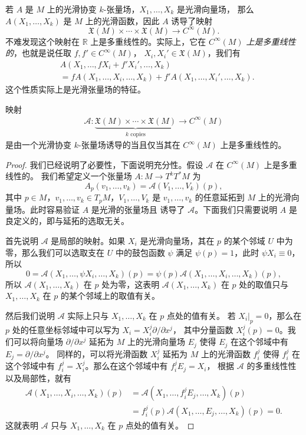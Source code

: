 若 $A$ 是 $M$ 上的光滑协变 $k$-张量场，$X_1,\dots,X_k$ 是光滑向量场，
那么 $A(X_1,\dots,X_k)$ 是 $M$ 上的光滑函数，因此 $A$ 诱导了映射
\[
  \mathfrak{X}(M)\times\cdots\times \mathfrak{X}(M)\to C^\infty(M).  
\]
不难发现这个映射在 $\mathbb{R}$ 上是多重线性的。实际上，它在 
\emph{$C^\infty(M)$ 上是多重线性的}，也就是说任取 $f,f'\in C^\infty(M)$，
$X_i,X_i'\in \mathfrak{X}(M)$，我们有
\begin{align*}
  &A(X_1,\dots,fX_i+f'X_i',\dots,X_k)\\
  &=fA(X_1,\dots,X_i,\dots,X_k)+f'A(X_1,\dots,X_i',\dots,X_k).
\end{align*}
这个性质实际上是光滑张量场的特征。

\begin{lemma}[张量表征引理]\label{lemma:tensor characterization 1}
  映射
  \begin{align*}
    \mathcal{A}:\underbrace{\mathfrak{X}(M)\times\cdots\times \mathfrak{X}(M)}
    _{\text{$k$ copies}}\to C^\infty(M)
  \end{align*}
  是由一个光滑协变 $k$-张量场诱导的当且仅当其在 $C^\infty(M)$ 上是多重线性的。
\end{lemma}
\begin{proof}
  我们已经说明了必要性，下面说明充分性。假设 $\mathcal{A}$ 在 $C^\infty(M)$ 上是多重线性的。
  我们希望定义一个张量场 $A:M\to T^kT^*M$ 为
  \[
    A_p(v_1,\dots,v_k)=\mathcal{A}(V_1,\dots,V_k)(p),  
  \]
  其中 $p\in M$，$v_1,\dots,v_k\in T_pM$，$V_1,\dots,V_k$ 是 $v_1,\dots,v_k$
  的任意延拓到 $M$ 上的光滑向量场。此时容易验证 $A$ 是光滑的张量场且
  诱导了 $\mathcal{A}$。下面我们只需要说明 $A$ 是良定义的，即与延拓的选取无关。

  首先说明 $\mathcal{A}$ 是局部的映射。如果 $X_i$ 是光滑向量场，其在 $p$
  的某个邻域 $U$ 中为零，那么我们可以选取支在 $U$ 中的鼓包函数 $\psi$
  满足 $\psi(p)=1$，此时 $\psi X_i\equiv 0$，所以
  \[
    0=\mathcal{A}(X_1,\dots,\psi X_i,\dots,X_k)(p)= 
  \psi(p)\mathcal{A}(X_1,\dots,X_i,\dots,X_k)(p),
  \]
  所以 $\mathcal{A}(X_1,\dots,X_k)$ 在 $p$ 处为零，这表明 $\mathcal{A}(X_1,\dots,X_k)$
  在 $p$ 处的取值只与 $X_1,\dots,X_k$ 在 $p$ 的某个邻域上的取值有关。

  然后我们说明 $\mathcal{A}$ 实际上只与 $X_1,\dots,X_k$ 在 $p$ 点处的值有关。
  若 $X_i|_p=0$，那么在 $p$ 处的任意坐标邻域中可以写为 $X_i=X_i^j\partial/\partial x^j$，
  其中分量函数 $X_i^j(p)=0$。我们可以将向量场 $\partial/\partial x^j$
  延拓为 $M$ 上的光滑向量场 $E_j$ 使得 $E_j$ 在这个邻域中有 $E_j=\partial/\partial x^j$。
  同样的，可以将光滑函数 $X_i^j$ 延拓为 $M$ 上的光滑函数 $f_i^j$ 使得
  $f_i^j$ 在这个邻域中有 $f_i^j=X_i^j$。那么在这个邻域中有 $f_i^jE_j=X_i$，
  根据 $\mathcal{A}$ 的多重线性性以及局部性，就有
  \begin{align*}
    \mathcal{A}(X_1,\dots,X_i,\dots,X_k)(p)&=
    \mathcal{A}(X_1,\dots,f_i^jE_j,\dots,X_k)(p)\\
    &=f_i^j(p)\mathcal{A}(X_1,\dots,E_j,\dots,X_k)(p)=0.
  \end{align*} 
  这就表明 $\mathcal{A}$ 只与 $X_1,\dots,X_k$ 在 $p$ 点处的值有关。
\end{proof}

